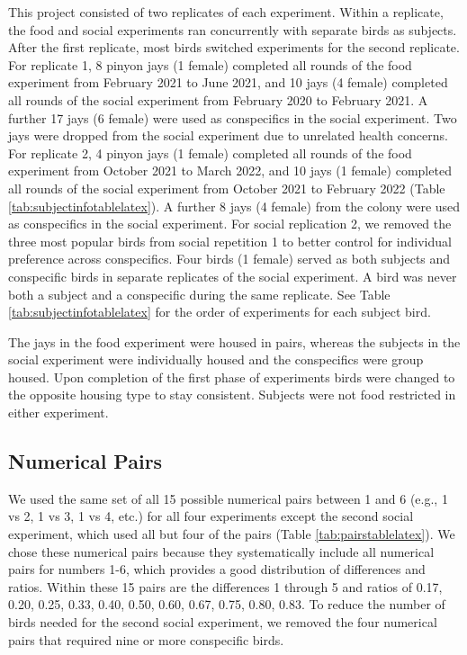 \documentclass[
  ,pub,floatsintext]{apa6}
\begin{document}
This project consisted of two replicates of each experiment. Within a replicate, the food and social experiments ran concurrently with separate birds as subjects. After the first replicate, most birds switched experiments for the second replicate. For replicate 1, 8 pinyon jays (1 female) completed all rounds of the food experiment from February 2021 to June 2021, and 10 jays (4 female) completed all rounds of the social experiment from February 2020 to February 2021. A further 17 jays (6 female) were used as conspecifics in the social experiment. Two jays were dropped from the social experiment due to unrelated health concerns. For replicate 2, 4 pinyon jays (1 female) completed all rounds of the food experiment from October 2021 to March 2022, and 10 jays (1 female) completed all rounds of the social experiment from October 2021 to February 2022 (Table \ref{tab:subjectinfotablelatex}). A further 8 jays (4 female) from the colony were used as conspecifics in the social experiment. For social replication 2, we removed the three most popular birds from social repetition 1 to better control for individual preference across conspecifics. Four birds (1 female) served as both subjects and conspecific birds in separate replicates of the social experiment. A bird was never both a subject and a conspecific during the same replicate. See Table \ref{tab:subjectinfotablelatex} for the order of experiments for each subject bird.

The jays in the food experiment were housed in pairs, whereas the subjects in the social experiment were individually housed and the conspecifics were group housed. Upon completion of the first phase of experiments birds were changed to the opposite housing type to stay consistent. Subjects were not food restricted in either experiment.

\hypertarget{numerical-pairs}{%
\subsection{Numerical Pairs}\label{numerical-pairs}}

We used the same set of all 15 possible numerical pairs between 1 and 6 (e.g., 1 vs 2, 1 vs 3, 1 vs 4, etc.) for all four experiments except the second social experiment, which used all but four of the pairs (Table \ref{tab:pairstablelatex}). We chose these numerical pairs because they systematically include all numerical pairs for numbers 1-6, which provides a good distribution of differences and ratios. Within these 15 pairs are the differences 1 through 5 and ratios of 0.17, 0.20, 0.25, 0.33, 0.40, 0.50, 0.60, 0.67, 0.75, 0.80, 0.83. To reduce the number of birds needed for the second social experiment, we removed the four numerical pairs that required nine or more conspecific birds.
\end{document}

